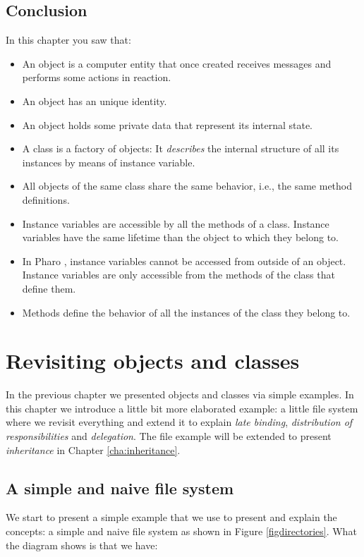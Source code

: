 \documentclass[10pt,twoside,english]{_support/latex/sbabook/sbabook}
\begin{document}
\section{Conclusion}
In this chapter you saw that: 

\begin{itemize}
\item An object is a computer entity that once created receives messages and performs some actions in reaction.
\item An object has an unique identity.
\item An object holds some private data that represent its internal state.
\end{itemize}

\begin{itemize}
\item A class is a factory of objects: It \textit{describes} the internal structure of all its instances by means of instance variable. 
\item All objects of the same class share the same behavior, i.e., the same method definitions.
\item Instance variables are accessible by all the methods of a class. Instance variables have the same lifetime than the object to which they belong to.
\item In Pharo , instance variables cannot be accessed from outside of an object. Instance variables are only accessible from the methods of the class that define them.
\item Methods define the behavior of all the instances  of the class they belong to.
\end{itemize}
\chapter{Revisiting objects and classes}
In the previous chapter we presented objects and classes via simple examples. In this chapter we introduce a little bit more elaborated example: a little file system where we revisit everything and extend it to explain \textit{late binding}, \textit{distribution of responsibilities} and \textit{delegation}. The file example will be extended to present \textit{inheritance} in Chapter \ref{cha:inheritance}.
\section{A simple and naive file system}
We start to present a simple example that we use to present and explain the concepts: a simple and naive file system as shown in Figure \ref{figdirectories}. 
What the diagram shows is that we have:
\end{document}
